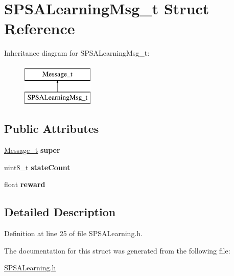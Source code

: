 \hypertarget{structSPSALearningMsg__t}{
\section{SPSALearningMsg\_\-t Struct Reference}
\label{structSPSALearningMsg__t}
}
Inheritance diagram for SPSALearningMsg\_\-t:\begin{figure}[H]
\begin{center}
\leavevmode
\includegraphics[height=2.000000cm]{structSPSALearningMsg__t}
\end{center}
\end{figure}
\subsection*{Public Attributes}
\begin{DoxyCompactItemize}
\item 
\hypertarget{structSPSALearningMsg__t_ae45b1963734c38e9319ed8f2b7537c5e}{
\hyperlink{structMessage__t}{Message\_\-t} {\bfseries super}}
\label{structSPSALearningMsg__t_ae45b1963734c38e9319ed8f2b7537c5e}

\item 
\hypertarget{structSPSALearningMsg__t_a63ac4784a536302d8e9f86f7fd1c801a}{
uint8\_\-t {\bfseries stateCount}}
\label{structSPSALearningMsg__t_a63ac4784a536302d8e9f86f7fd1c801a}

\item 
\hypertarget{structSPSALearningMsg__t_ab892b3dbbf9b9be7c7eeda8e15e02f14}{
float {\bfseries reward}}
\label{structSPSALearningMsg__t_ab892b3dbbf9b9be7c7eeda8e15e02f14}

\end{DoxyCompactItemize}


\subsection{Detailed Description}


Definition at line 25 of file SPSALearning.h.



The documentation for this struct was generated from the following file:\begin{DoxyCompactItemize}
\item 
\hyperlink{SPSALearning_8h}{SPSALearning.h}\end{DoxyCompactItemize}
